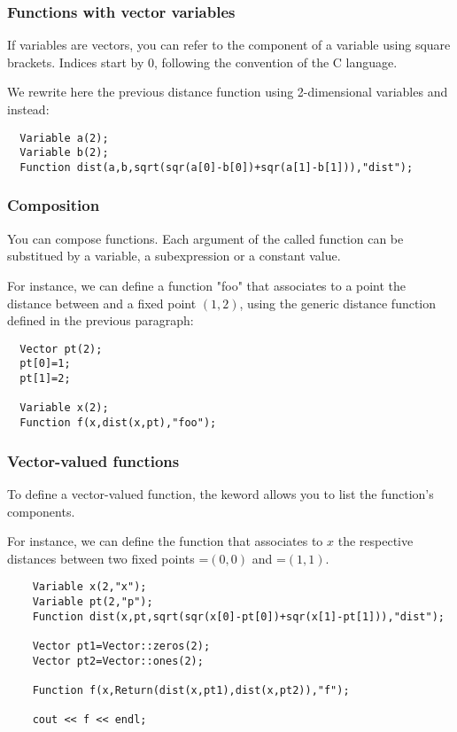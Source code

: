 \subsubsection{Functions with vector variables}

If variables are vectors, you can refer to the component
of a variable using square brackets. Indices start by 0,
following the convention of the C language.

We rewrite here the previous distance function using 2-dimensional
variables  and  instead:
\begin{lstlisting}
  Variable a(2);
  Variable b(2);
  Function dist(a,b,sqrt(sqr(a[0]-b[0])+sqr(a[1]-b[1])),"dist");
\end{lstlisting}

\subsubsection{Composition}

You can compose functions. Each argument of the called function can be substitued
by a variable, a subexpression or a constant value.

For instance, we can define a function "foo" that associates to
a point  the distance between  and a fixed point $(1,2)$,
using the generic distance function defined in the previous paragraph:

\begin{lstlisting}
  Vector pt(2);
  pt[0]=1;
  pt[1]=2;

  Variable x(2);
  Function f(x,dist(x,pt),"foo");
\end{lstlisting}

\subsubsection{Vector-valued functions}

To define a vector-valued function, the  keword allows
you to list the function's components.

For instance, we can define the function that associates to $x$ the 
respective distances between two fixed points =$(0,0)$ and =$(1,1)$.

\begin{lstlisting}	
	Variable x(2,"x");
	Variable pt(2,"p");
	Function dist(x,pt,sqrt(sqr(x[0]-pt[0])+sqr(x[1]-pt[1])),"dist");

	Vector pt1=Vector::zeros(2);
	Vector pt2=Vector::ones(2);

	Function f(x,Return(dist(x,pt1),dist(x,pt2)),"f");

	cout << f << endl;
\end{lstlisting}

